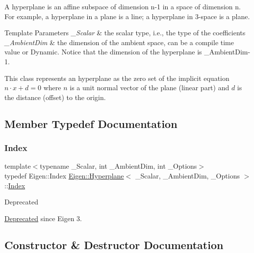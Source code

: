 A hyperplane is an affine subspace of dimension n-\/1 in a space of dimension n. For example, a hyperplane in a plane is a line; a hyperplane in 3-\/space is a plane.


\begin{DoxyTemplParams}{Template Parameters}
{\em \+\_\+\+Scalar} & the scalar type, i.\+e., the type of the coefficients \\
\hline
{\em \+\_\+\+Ambient\+Dim} & the dimension of the ambient space, can be a compile time value or Dynamic. Notice that the dimension of the hyperplane is \+\_\+\+Ambient\+Dim-\/1.\\
\hline
\end{DoxyTemplParams}
This class represents an hyperplane as the zero set of the implicit equation $ n \cdot x + d = 0 $ where $ n $ is a unit normal vector of the plane (linear part) and $ d $ is the distance (offset) to the origin. 

\subsection{Member Typedef Documentation}
\mbox{\label{class_eigen_1_1_hyperplane_a58d2307d16128a0026021374e9e10465}} 
\subsubsection{\texorpdfstring{Index}{Index}}
{\footnotesize\ttfamily template$<$typename \+\_\+\+Scalar, int \+\_\+\+Ambient\+Dim, int \+\_\+\+Options$>$ \\
typedef Eigen\+::\+Index \mbox{\hyperlink{class_eigen_1_1_hyperplane}{Eigen\+::\+Hyperplane}}$<$ \+\_\+\+Scalar, \+\_\+\+Ambient\+Dim, \+\_\+\+Options $>$\+::\mbox{\hyperlink{class_eigen_1_1_hyperplane_a58d2307d16128a0026021374e9e10465}{Index}}}

\begin{DoxyRefDesc}{Deprecated}
\item[\mbox{\hyperlink{deprecated__deprecated000028}{Deprecated}}]since Eigen 3. \end{DoxyRefDesc}


\subsection{Constructor \& Destructor Documentation}
\mbox{\label{class_eigen_1_1_hyperplane_a98d2a770332eec864a897a8ef5bb6025}} 
